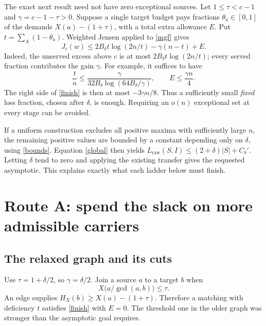 \documentclass[11pt,a4paper]{article}
\newcommand{\LP}{L_{\mathrm{raw}}}
\begin{document}
The exact next result need not have zero exceptional sources.
Let $1\le\tau<c-1$ and $\gamma=c-1-\tau>0$. Suppose a single target budget
pays fractions $\theta_a\in[0,1]$ of the demands $X(a)-(1+\tau)$, with a total
extra allowance $E$. Put $t=\sum_A(1-\theta_a)$. Weighted Jensen applied to
\eqref{mgf} gives
\begin{equation}
 \boxed{\quad J_c(w)\le
 2B_\delta t\log(2n/t)-\gamma(n-t)+E.\quad}              \label{finish}
\end{equation}
Indeed, the unserved excess above $c$ is at most
$2B_\delta t\log(2n/t)$; every served fraction contributes the gain $\gamma$.
For example, it suffices to have
\[
 \frac tn\le\frac{\gamma}{32B_\delta\log(64B_\delta/\gamma)},
 \qquad E\le\frac{\gamma n}{4}.
\]
The right side of \eqref{finish} is then at most $-3\gamma n/8$.
Thus a sufficiently small \emph{fixed} loss fraction, chosen after $\delta$,
is enough. Requiring an $o(n)$ exceptional set at every stage can be avoided.

If a uniform construction excludes all positive maxima with sufficiently
large $n$, the remaining positive values are bounded by a constant depending
only on $\delta$, using \eqref{bounds}. Equation \eqref{global} then yields
$\LP(S,I)\le(2+\delta)|S|+C_\delta'$. Letting $\delta$ tend to zero and applying
the existing transfer gives the requested asymptotic. This explains exactly
what each ladder below must finish.

\section{Route A: spend the slack on more admissible carriers}

\subsection{The relaxed graph and its cuts}

Use $\tau=1+\delta/2$, so $\gamma=\delta/2$. Join a source $a$ to a target $b$
when
\begin{equation}
 X\bigl(a/\gcd(a,b)\bigr)\le\tau.                        \label{edge}
\end{equation}
An edge supplies
$H_X(b)\ge X(a)-(1+\tau)$. Therefore a matching with deficiency $t$ satisfies
\eqref{finish} with $E=0$. The threshold one in the older graph was stronger
than the asymptotic goal requires.
\end{document}
